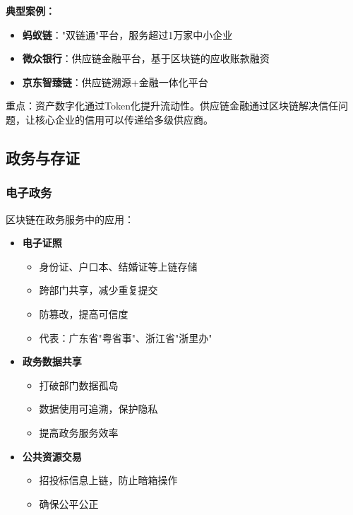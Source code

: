 ﻿\documentclass[12pt,a4paper]{article}
\begin{document}
\textbf{典型案例：}
\begin{itemize}[leftmargin=1.5em]
\item \textbf{蚂蚁链}："双链通"平台，服务超过1万家中小企业
\item \textbf{微众银行}：供应链金融平台，基于区块链的应收账款融资
\item \textbf{京东智臻链}：供应链溯源+金融一体化平台
\end{itemize}

\begin{keypointbox}
重点：资产数字化通过Token化提升流动性。供应链金融通过区块链解决信任问题，让核心企业的信用可以传递给多级供应商。
\end{keypointbox}

\subsection{政务与存证}

\subsubsection{电子政务}

区块链在政务服务中的应用：

\begin{itemize}[leftmargin=1.5em]
\item \textbf{电子证照}
  \begin{itemize}
  \item 身份证、户口本、结婚证等上链存储
  \item 跨部门共享，减少重复提交
  \item 防篡改，提高可信度
  \item 代表：广东省"粤省事"、浙江省"浙里办"
  \end{itemize}
\item \textbf{政务数据共享}
  \begin{itemize}
  \item 打破部门数据孤岛
  \item 数据使用可追溯，保护隐私
  \item 提高政务服务效率
  \end{itemize}
\item \textbf{公共资源交易}
  \begin{itemize}
  \item 招投标信息上链，防止暗箱操作
  \item 确保公平公正
  \end{itemize}
\end{itemize}
\end{document}
